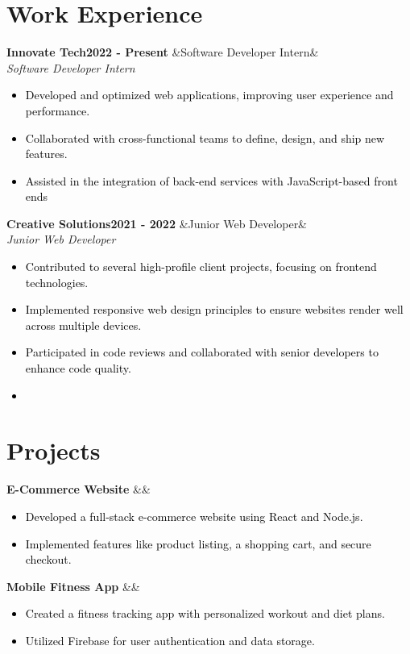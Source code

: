 \documentclass[a4paper,8pt]{article}
\newcommand{\entryItems}[4]{
    \noindent\textbf{\color{headerColor}#1}\hfill\textbf{\color{subHeaderColor}#2}
    \ifx&#3&\else\\\noindent\textit{\color{subHeaderColor}#3}\fi
      #4
    \vspace{5pt} %
  }
\begin{document}
  \color{headerColor}\section{Work Experience}
\vspace{1ex}\entryItems{Innovate Tech}{2022 - Present}{Software Developer Intern}{\textcolor{black}{{
      \begin{itemize}
        \item Developed and optimized web applications, improving user experience and performance.
\item Collaborated with cross-functional teams to define, design, and ship new features.
\item Assisted in the integration of back-end services with JavaScript-based front ends
      \end{itemize}
    }}}
\entryItems{Creative Solutions}{2021 - 2022}{Junior Web Developer}{\textcolor{black}{{
      \begin{itemize}
        \item Contributed to several high-profile client projects, focusing on frontend technologies.
\item Implemented responsive web design principles to ensure websites render well across multiple devices.
\item Participated in code reviews and collaborated with senior developers to enhance code quality.
\item 
      \end{itemize}
    }}}
\color{headerColor}\section{Projects}
\vspace{1ex}\entryItems{E-Commerce Website}{}{}{\textcolor{black}{{
      \begin{itemize}
        \item Developed a full-stack e-commerce website using React and Node.js.
\item Implemented features like product listing, a shopping cart, and secure checkout.
      \end{itemize}
    }}}
\entryItems{Mobile Fitness App}{}{}{\textcolor{black}{{
      \begin{itemize}
        \item Created a fitness tracking app with personalized workout and diet plans.
\item Utilized Firebase for user authentication and data storage.
      \end{itemize}
    }}}

  
\end{document}

